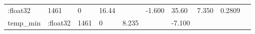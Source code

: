 \documentclass[]{article}
\begin{document}
\begin{longtable}[]{@{}llllllllll@{}}
\begin{minipage}[t]{0.11\columnwidth}
:float32\strut
\end{minipage} & \begin{minipage}[t]{0.06\columnwidth}\raggedright\strut
1461\strut
\end{minipage} & \begin{minipage}[t]{0.07\columnwidth}\raggedright\strut
0\strut
\end{minipage} & \begin{minipage}[t]{0.07\columnwidth}\raggedright\strut
16.44\strut
\end{minipage} & \begin{minipage}[t]{0.04\columnwidth}\raggedright\strut
\strut
\end{minipage} & \begin{minipage}[t]{0.07\columnwidth}\raggedright\strut
-1.600\strut
\end{minipage} & \begin{minipage}[t]{0.07\columnwidth}\raggedright\strut
35.60\strut
\end{minipage} & \begin{minipage}[t]{0.12\columnwidth}\raggedright\strut
7.350\strut
\end{minipage} & \begin{minipage}[t]{0.05\columnwidth}\raggedright\strut
0.2809\strut
\end{minipage}\tabularnewline
\begin{minipage}[t]{0.08\columnwidth}\raggedright\strut
temp\_min\strut
\end{minipage} & \begin{minipage}[t]{0.11\columnwidth}\raggedright\strut
:float32\strut
\end{minipage} & \begin{minipage}[t]{0.06\columnwidth}\raggedright\strut
1461\strut
\end{minipage} & \begin{minipage}[t]{0.07\columnwidth}\raggedright\strut
0\strut
\end{minipage} & \begin{minipage}[t]{0.07\columnwidth}\raggedright\strut
8.235\strut
\end{minipage} & \begin{minipage}[t]{0.04\columnwidth}\raggedright\strut
\strut
\end{minipage} & \begin{minipage}[t]{0.07\columnwidth}\raggedright\strut
-7.100\strut
\end{minipage} & \begin{minipage}[t]{0.07\columnwidth}\raggedright\strut

\end{minipage}
\end{longtable}
\end{document}
